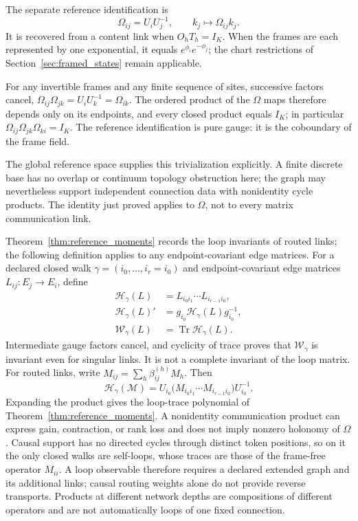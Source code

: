 \documentclass[twoside,11pt]{article}
\begin{document}
The separate reference identification is
\begin{equation}
\Omega_{ij}=U_iU_j^{-1},\qquad
k_j\mapsto\Omega_{ij}k_j.
\label{eq:gauge_frame_rotation}
\end{equation}
It is recovered from a content link when $O_hT_h=I_K$. When the frames are each represented by one exponential, it equals $e^{\phi_i}e^{-\phi_j}$; the chart restrictions of Section~\ref{sec:framed_states} remain applicable.
\begin{remark}
\label{rem:flat_identification}
For any invertible frames and any finite sequence of sites, successive factors cancel, $\Omega_{ij}\Omega_{jk}=U_iU_k^{-1}=\Omega_{ik}$. The ordered product of the $\Omega$ maps therefore depends only on its endpoints, and every closed product equals $I_K$; in particular $\Omega_{ij}\Omega_{jk}\Omega_{ki}=I_K$. The reference identification is pure gauge: it is the coboundary of the frame field.
\end{remark}
The global reference space supplies this trivialization explicitly. A finite discrete base has no overlap or continuum topology obstruction here; the graph may nevertheless support independent connection data with nonidentity cycle products. The identity just proved applies to $\Omega$, not to every matrix communication link.

Theorem~\ref{thm:reference_moments} records the loop invariants of routed links; the following definition applies to any endpoint-covariant edge matrices. For a declared closed walk \(\gamma=(i_0,\ldots,i_r=i_0)\) and endpoint-covariant edge matrices \(L_{ij}:E_j\to E_i\), define
\begin{align}
\mathcal H_\gamma(L)&=L_{i_0i_1}\cdots L_{i_{r-1}i_0},\\
\mathcal H_\gamma(L)'&=g_{i_0}\mathcal H_\gamma(L)g_{i_0}^{-1},\\
\mathcal W_\gamma(L)&=\operatorname{Tr}\mathcal H_\gamma(L).
\label{eq:main_matrix_loop_trace}
\end{align}
Intermediate gauge factors cancel, and cyclicity of trace proves that \(\mathcal W_\gamma\) is invariant even for singular links. It is not a complete invariant of the loop matrix. For routed links, write \(M_{ij}=\sum_h\beta_{ij}^{(h)}M_h\). Then
\begin{equation}
\mathcal H_\gamma(\mathcal M)
=U_{i_0}\bigl(M_{i_0i_1}\cdots M_{i_{r-1}i_0}\bigr)U_{i_0}^{-1}.
\label{eq:main_routed_loop_body}
\end{equation}
Expanding the product gives the loop-trace polynomial of Theorem~\ref{thm:reference_moments}. A nonidentity communication product can express gain, contraction, or rank loss and does not imply nonzero holonomy of \(\Omega\). Causal support has no directed cycles through distinct token positions, so on it the only closed walks are self-loops, whose traces are those of the frame-free operator \(M_{ii}\). A loop observable therefore requires a declared extended graph and its additional links; causal routing weights alone do not provide reverse transports. Products at different network depths are compositions of different operators and are not automatically loops of one fixed connection.
\end{document}
